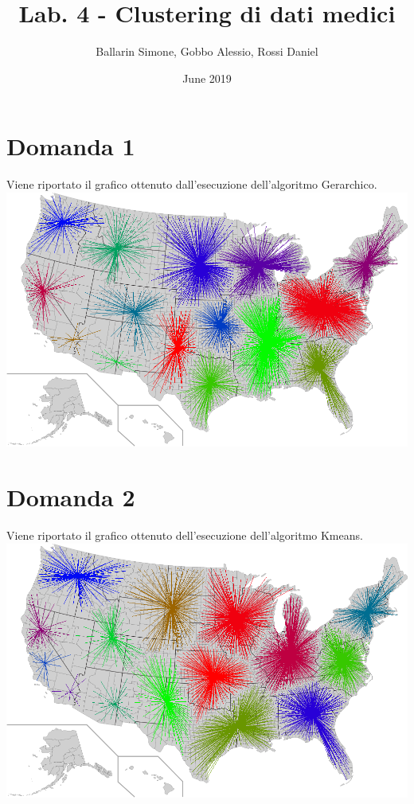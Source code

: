 \documentclass{article}
\title{Lab. 4 - Clustering di dati medici}
\author{Ballarin Simone, Gobbo Alessio, Rossi Daniel}
\date{June 2019}
\begin{document}
\maketitle

\section*{Domanda 1}
Viene riportato il grafico ottenuto dall'esecuzione dell'algoritmo Gerarchico.\\
\includegraphics[width=1.0\linewidth, valign=t]{figures/Domanda1}

\section*{Domanda 2}
Viene riportato il grafico ottenuto dell'esecuzione dell'algoritmo Kmeans.\\
\includegraphics[width=1.0\linewidth, valign=t]{figures/Domanda2}
\end{document}
